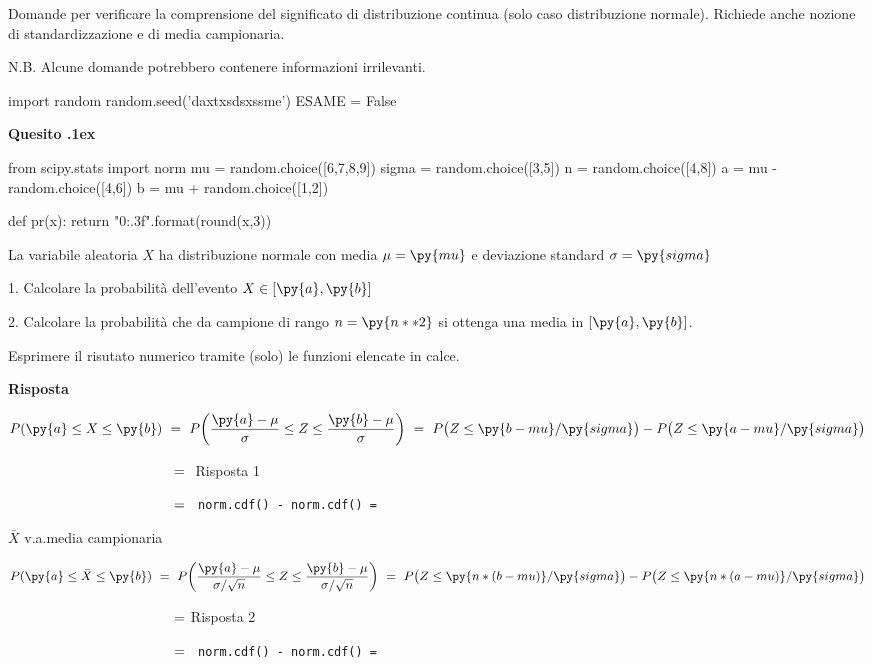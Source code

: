 \documentclass[11pt,twoside,a4paper]{article}
\newcounter{quesito}
\newenvironment{question}{\addtocounter{quesito}{1}\bigskip\bigskip\par\textbf{Quesito \thequesito.\kern1ex}}{\vspace{\parskip}}
\newenvironment{answer}{\par\textbf{Risposta\quad}}{\vspace{\parskip}}
\begin{document}
Domande per verificare la comprensione del significato di distribuzione continua (solo caso distribuzione normale). Richiede anche nozione di standardizzazione e di media campionaria.

N.B. Alcune domande potrebbero contenere informazioni irrilevanti.
\bigskip\bigskip


\begin{pycode}
import random
random.seed('daxtxsdsxssme')
ESAME = False
\end{pycode}

\begin{question} %
\begin{pycode}
from scipy.stats import norm
mu = random.choice([6,7,8,9])
sigma = random.choice([3,5])
n = random.choice([4,8])
a = mu - random.choice([4,6])
b = mu + random.choice([1,2])

def pr(x):
    return "{0:.3f}".format(round(x,3))
\end{pycode}
La variabile aleatoria $X$ ha distribuzione normale con media $\mu=\py{mu}$ e deviazione standard $\sigma=\py{sigma}$ 

1. Calcolare la probabilità dell'evento $X\in [\py{a},\py{b}]$ 

2. Calcolare la probabilità che da campione di rango $n=\py{n**2}$ si ottenga una media in $[\py{a},\py{b}]$. 

Esprimere il risutato numerico tramite (solo) le funzioni elencate in calce.
\begin{answer}

$P(\py{a}\le X\le\py{b})\ =\ P\bigg(\dfrac{\py{a}-\mu}{\sigma}\le Z\le\dfrac{\py{b}-\mu}{\sigma}\bigg)\ =\  P\big(Z\le\py{b-mu}/\py{sigma}\big) -  P\big(Z\le\py{a-mu}/\py{sigma}\big)$ 

$\phantom{P(\py{a}\le X\le\py{b})}\ =\ ${ \hfill Risposta 1}

$\phantom{P(\py{a}\le X\le\py{b})}\ =\ ${\tt\ norm.cdf() -  norm.cdf() = }

$\bar X$ v.a.\@ media campionaria

$P(\py{a}\le\bar X\le\py{b})\ =\ P\bigg(\dfrac{\py{a}-\mu}{\sigma/\sqrt{n}}\le Z\le\dfrac{\py{b}-\mu}{\sigma/\sqrt{n}}\bigg)\ =\  P\big(Z\le\py{n*(b-mu)}/\py{sigma}\big) -  P\big(Z\le\py{n*(a-mu)}/\py{sigma}\big)$

$\phantom{P(\py{a}\le\bar X\le\py{b})}\ =\ ${\hfill Risposta 2}

$\phantom{P(\py{a}\le\bar X\le\py{b})}\ =\ ${\tt\ norm.cdf() -  norm.cdf()  = }

\end{answer}
\end{question}
\end{document}
